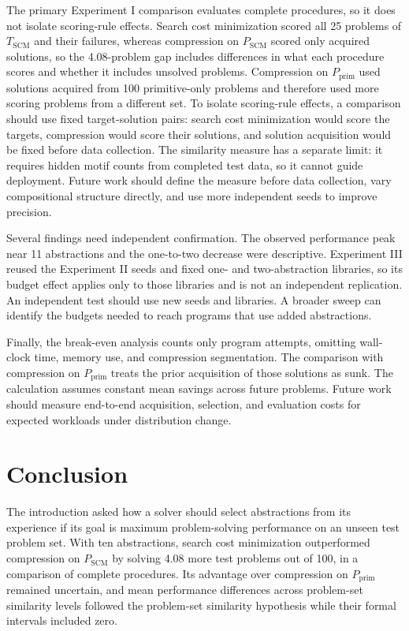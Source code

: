 \documentclass[10pt]{article}
\begin{document}
The primary Experiment I comparison evaluates complete procedures, so it does
not isolate scoring-rule effects. Search cost minimization scored all 25
problems of $T_{\mathrm{SCM}}$ and their failures, whereas
compression on $P_{\mathrm{SCM}}$ scored only acquired solutions,
so the 4.08-problem gap includes differences in what each procedure scores
and whether it includes unsolved problems. Compression on
$P_{\mathrm{prim}}$ used solutions acquired from 100 primitive-only
problems and therefore used more scoring problems from a different set. To
isolate scoring-rule effects, a comparison should use fixed target-solution
pairs: search cost minimization would score the targets, compression would
score their solutions, and solution acquisition would be fixed before data
collection. The similarity measure has a separate limit: it requires hidden
motif counts from completed test data, so it cannot guide deployment. Future work should define the measure before data collection,
vary compositional structure directly, and use more independent seeds to improve
precision.

Several findings need independent confirmation. The observed performance peak
near 11 abstractions and the one-to-two decrease were descriptive.
Experiment III reused the Experiment II seeds and fixed one- and
two-abstraction libraries, so its budget effect applies only to those libraries
and is not an independent replication. An independent test should use new seeds
and libraries. A broader sweep can identify the budgets needed to reach
programs that use added abstractions.

Finally, the break-even analysis counts only program attempts, omitting
wall-clock time, memory use, and compression segmentation. The comparison
with compression on $P_{\mathrm{prim}}$ treats the prior
acquisition of those solutions as
sunk. The calculation assumes constant mean savings across future problems.
Future work should measure end-to-end acquisition, selection, and evaluation
costs for expected workloads under distribution change.

\section{Conclusion}

The introduction asked how a solver should select abstractions from its
experience if its goal is maximum problem-solving performance on an unseen
test problem set. With ten abstractions, search cost minimization
outperformed compression on $P_{\mathrm{SCM}}$ by solving 4.08 more test
problems out of 100, in a comparison of complete procedures. Its advantage
over compression on $P_{\mathrm{prim}}$ remained uncertain, and mean
performance differences across problem-set similarity levels followed the
problem-set similarity hypothesis while their formal intervals included
zero.
\end{document}
